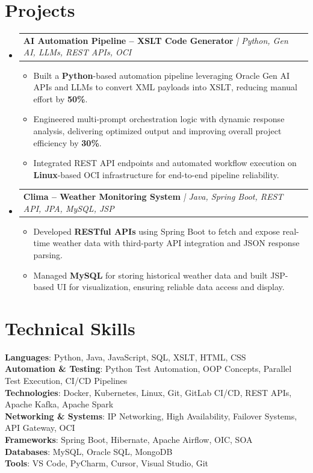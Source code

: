 \documentclass[letterpaper,11pt]{article}
\makeatletter
\newcommand{\resumeItem}[1]{
  \item\small{
    {#1 \vspace{-2pt}}
  }
}
\newcommand{\resumeProjectHeading}[2]{
    \item
    \begin{tabular*}{0.97\textwidth}{l@{\extracolsep{\fill}}r}
      \small#1 & #2 \\
    \end{tabular*}\vspace{-7pt}
}
\newcommand{\resumeSubHeadingListStart}{\begin{itemize}[leftmargin=0.15in, label={}]}
\newcommand{\resumeSubHeadingListEnd}{\end{itemize}}
\newcommand{\resumeItemListStart}{\begin{itemize}}
\newcommand{\resumeItemListEnd}{\end{itemize}\vspace{-5pt}}
\makeatother
\begin{document}
\section{Projects}
\resumeSubHeadingListStart
    \resumeProjectHeading
        {\textbf{AI Automation Pipeline -- XSLT Code Generator} \textit{| Python, Gen AI, LLMs, REST APIs, OCI}}{}
    \resumeItemListStart
        \resumeItem{Built a \textbf{Python}-based automation pipeline leveraging Oracle Gen AI APIs and LLMs to convert XML payloads into XSLT, reducing manual effort by \textbf{50\%}.}
        \resumeItem{Engineered multi-prompt orchestration logic with dynamic response analysis, delivering optimized output and improving overall project efficiency by \textbf{30\%}.}
        \resumeItem{Integrated REST API endpoints and automated workflow execution on \textbf{Linux}-based OCI infrastructure for end-to-end pipeline reliability.}
    \resumeItemListEnd
    \resumeProjectHeading
        {\textbf{Clima -- Weather Monitoring System} \textit{| Java, Spring Boot, REST API, JPA, MySQL, JSP}}{}
    \resumeItemListStart
        \resumeItem{Developed \textbf{RESTful APIs} using Spring Boot to fetch and expose real-time weather data with third-party API integration and JSON response parsing.}
        \resumeItem{Managed \textbf{MySQL} for storing historical weather data and built JSP-based UI for visualization, ensuring reliable data access and display.}
    \resumeItemListEnd
\resumeSubHeadingListEnd

\section{Technical Skills}
\begin{itemize}[leftmargin=0.15in, label={}]
    \small{\item{
        \textbf{Languages}{: Python, Java, JavaScript, SQL, XSLT, HTML, CSS} \\
        \textbf{Automation \& Testing}{: Python Test Automation, OOP Concepts, Parallel Test Execution, CI/CD Pipelines} \\
        \textbf{Technologies}{: Docker, Kubernetes, Linux, Git, GitLab CI/CD, REST APIs, Apache Kafka, Apache Spark} \\
        \textbf{Networking \& Systems}{: IP Networking, High Availability, Failover Systems, API Gateway, OCI} \\
        \textbf{Frameworks}{: Spring Boot, Hibernate, Apache Airflow, OIC, SOA} \\
        \textbf{Databases}{: MySQL, Oracle SQL, MongoDB} \\
        \textbf{Tools}{: VS Code, PyCharm, Cursor, Visual Studio, Git}
    }}
\end{itemize}
\end{document}
